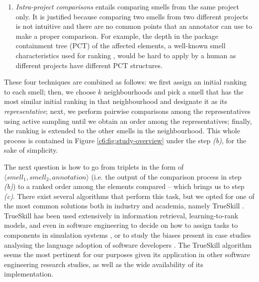 \begin{enumerate}
    \item \emph{Intra-project comparisons} entails comparing smells from the same project only. It is justified because comparing two smells from two different projects is not intuitive and there are no common points that an annotator can use to make a proper comparison.
    For example, the depth in the package containment tree (PCT) of the affected elements, a well-known smell characteristics used for ranking \cite{Laval2012}, would be hard to apply by a human as different projects have different PCT structures.

\end{enumerate}
These four techniques are combined as follows: we first assign an initial ranking to each smell; then, we choose $k$ neighbourhoods and pick a smell that has the most similar initial ranking in that neighbourhood and designate it as its \emph{representative}; next, we perform pairwise comparisons among the representatives using active sampling until we obtain an order among the representatives; finally, the ranking is extended to the other smells in the neighbourhood.
This whole process is contained in Figure \ref{c6:fig:study-overview} under the step \emph{(b)}, for the sake of simplicity.

The next question is how to go from triplets in the form of $\langle smell_1, smell_2, annotation \rangle$ (i.e. the output of the comparison process in step \emph{(b)}) to a ranked order among the elements compared -- which brings us to step \emph{(c)}.
There exist several algorithms that perform this task, but we opted for one of the most common solutions both in industry and academia, namely TrueSkill \cite{Herbrich2006}.
TrueSkill has been used extensively in information retrieval, learning-to-rank models, and even in software engineering to decide on how to assign tasks to components in simulation systems \cite{Wienss2013}, or to study the biases present in case studies analysing the language adoption of software developers \cite{Meyerovich2012}.
The TrueSkill algorithm seems the most pertinent for our purposes given its application in other software engineering research studies, as well as the wide availability of its implementation.

